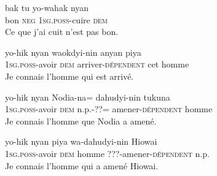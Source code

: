 \documentclass[oldfontcommands,twoside,a4paper,12pt]{article}
\begin{document}
 \begin{exe}
\ex  
\gll  bak tu yo-wahak nyan  \\
bon \textsc{neg} \textsc{1sg.poss}-cuire \textsc{dem} \\
 \glt   Ce que j'ai cuit n'est pas bon.
\end{exe}
 \begin{exe}
\ex  
\gll  
yo-hik nyan waokdyi-nin anyan piya \\
\textsc{1sg.poss}-avoir \textsc{dem}   arriver-\textsc{dépendent} cet homme \\
\glt Je connais l'homme qui est arrivé.
 \end{exe}
 \begin{exe}
\ex  
\gll  
yo-hik nyan Nodia-na= dahudyi-nin tukuna\\
\textsc{1sg.poss}-avoir \textsc{dem} n.p.-??= amener-\textsc{dépendent} homme \\
\glt Je connais l'homme que Nodia a amené.
 \end{exe}
 
  \begin{exe}
\ex  
\gll  
yo-hik nyan piya wa-dahudyi-nin Hiowai \\
\textsc{1sg.poss}-avoir \textsc{dem} homme ???-amener-\textsc{dépendent} n.p. \\
\glt Je connais l'homme qui a amené Hiowai.
 \end{exe}
 
 
\end{document}
